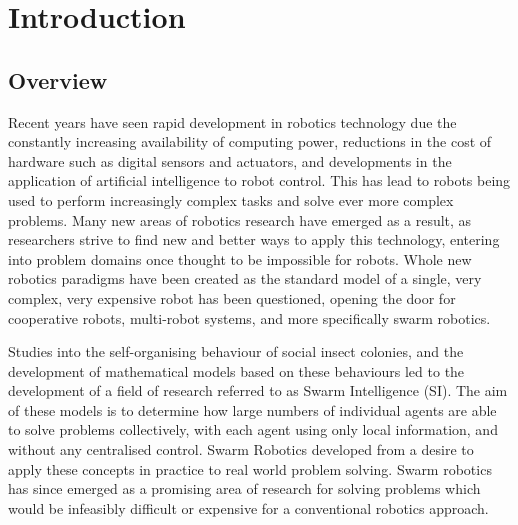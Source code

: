
\chapter[Introduction]{Introduction} %

\label{Chapter1} %


\newcommand{\keyword}[1]{\textbf{#1}}
\newcommand{\tabhead}[1]{\textbf{#1}}
\newcommand{\code}[1]{\texttt{#1}}
\newcommand{\file}[1]{\texttt{\bfseries#1}}
\newcommand{\option}[1]{\texttt{\itshape#1}}


\section{Overview}
Recent years have seen rapid development in robotics technology due the constantly increasing availability of computing power, reductions in the cost of hardware such as digital sensors and actuators, and developments in the application of artificial intelligence to robot control. This has lead to robots being used to perform increasingly complex tasks and solve ever more complex problems. Many new areas of robotics research have emerged as a result, as researchers strive to find new and better ways to apply this technology, entering into problem domains once thought to be impossible for robots. Whole new robotics paradigms have been created as the standard model of a single, very complex, very expensive robot has been questioned, opening the door for cooperative robots, multi-robot systems, and more specifically swarm robotics.

Studies into the self-organising behaviour of social insect colonies, and the development of mathematical models based on these behaviours led to the development of a field of research referred to as Swarm Intelligence (SI). The aim of these models is to determine how large numbers of individual agents are able to solve problems collectively, with each agent using only local information, and without any centralised control. Swarm Robotics developed from a desire to apply these concepts in practice to real world problem solving. Swarm robotics has since emerged as a promising area of research for solving problems which would be infeasibly difficult or expensive for a conventional robotics approach.

